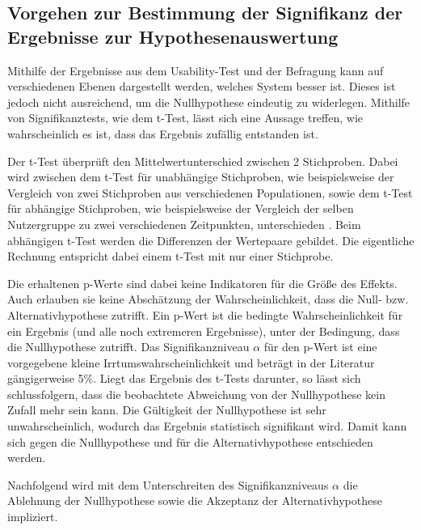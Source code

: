 \subsection{Vorgehen zur Bestimmung der Signifikanz der Ergebnisse zur Hypothesenauswertung} %
\label{ch:Ergebnisse:sec:Hypothesen_Auswertung:sub:Bsp_TTest}
Mithilfe der Ergebnisse aus dem Usability-Test und der Befragung kann auf verschiedenen Ebenen dargestellt werden, welches System besser ist. Dieses ist jedoch nicht ausreichend, um die Nullhypothese eindeutig zu widerlegen. Mithilfe von Signifikanztests, wie dem t-Test, lässt sich eine Aussage treffen, wie wahrscheinlich es ist, dass das Ergebnis zufällig entstanden ist. \cite[S. 401]{Statistik:Sedlmeier:2018}

Der t-Test überprüft den Mittelwertunterschied zwischen 2 Stichproben. Dabei wird zwischen dem t-Test für unabhängige Stichproben, wie beispielsweise der Vergleich von zwei Stichproben aus verschiedenen Populationen, sowie dem t-Test für abhängige Stichproben, wie beispielsweise der Vergleich der selben Nutzergruppe zu zwei verschiedenen Zeitpunkten, unterschieden \cite[S. 743]{Statistik:Boertz:2006}.    %
Beim abhängigen t-Test werden die Differenzen der Wertepaare gebildet. Die eigentliche Rechnung entspricht dabei einem t-Test mit nur einer Stichprobe. \cite[S. 414]{Statistik:Sedlmeier:2018}

Die erhaltenen p-Werte sind dabei keine Indikatoren für die Größe des Effekts. Auch erlauben sie keine Abschätzung der Wahrscheinlichkeit, dass die Null- bzw. Alternativhypothese zutrifft. \glqq Ein p-Wert ist die bedingte Wahrscheinlichkeit für ein Ergebnis (und alle noch extremeren Ergebnisse), unter der Bedingung, dass die Nullhypothese zutrifft.\grqq{} \cite[S. 401]{Statistik:Sedlmeier:2018} Das Signifikanzniveau $\alpha$ für den p-Wert ist eine vorgegebene kleine Irrtumswahrscheinlichkeit und beträgt in der Literatur gängigerweise 5\%. Liegt das Ergebnis des t-Tests darunter, so lässt sich schlussfolgern, dass die beobachtete Abweichung von der Nullhypothese kein Zufall mehr sein kann. Die Gültigkeit der Nullhypothese ist sehr unwahrscheinlich, wodurch das Ergebnis statistisch signifikant wird. Damit kann sich gegen die Nullhypothese und für die Alternativhypothese entschieden werden. \cite[S. 400\psqq]{Statistik:Sedlmeier:2018}

Nachfolgend wird mit dem Unterschreiten des Signifikanzniveaus $\alpha$ die Ablehnung der Nullhypothese sowie die Akzeptanz der Alternativhypothese impliziert.

